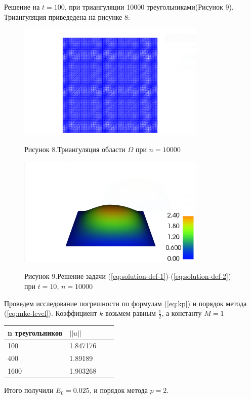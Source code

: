 Решение на $t=100$, при триангуляции 10000 треугольниками(Рисунок 9). Триангуляция приведедена на рисунке 8:
\begin{figure}[H]
      \centering
      \includegraphics[width=0.8\textwidth]{plots/n100_polygons.png}\\
      \centering\caption*{Рисунок 8.Триангуляция области $\Omega$ при $n=10000$}
\end{figure}
\begin{figure}[H]
      \centering
      \includegraphics[width=0.8\textwidth]{plots/n100t10.png}\\
  \centering\caption*{Рисунок 9.Решение задачи (\ref{eq:solution-def-1})-(\ref{eq:solution-def-2}) при $t=10$, $n=10000$}
\end{figure}

Проведем исследование погрешности по формулам (\ref{eq:kp}) и порядок метода (\ref{eq:mke-level}). Коэффициент $k$ возьмем равным $\frac{1}{2}$,
а константу $M=1$\\
\begin{center}
    \begin{tabular}{ | l | l | l | p{5cm} |}
    \hline
    n треугольников & $||u||$ \\ \hline
    100 &  1.847176 \\
    400 & 1.89189 \\
    1600 & 1.903268 \\
    \hline
    \end{tabular}
\end{center}
Итого получили $E_0=0.025$, и порядок метода $p=2$.
